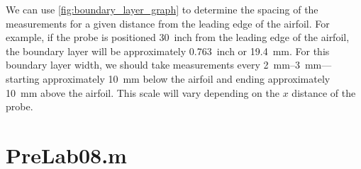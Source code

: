 We can use \autoref{fig:boundary_layer_graph} to determine the spacing of the measurements for a given distance from the leading edge of the airfoil. For example, if the probe is positioned \qty{30}{inch} from the leading edge of the airfoil, the boundary layer will be approximately \qty{0.763}{inch} or \qty{19.4}{\milli\meter}. For this boundary layer width, we should take measurements every \qtyrange{2}{3}{\milli\meter}—starting approximately \qty{10}{\milli\meter} below the airfoil and ending approximately \qty{10}{\milli\meter} above the airfoil. This scale will vary depending on the $x$ distance of the probe.

\section{PreLab08.m} \label{sec:code}

\inputminted{matlab}{Code/PreLab08.m}\label{listing:prelab_script}